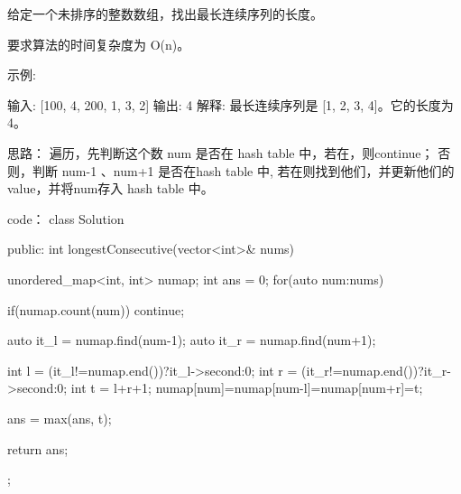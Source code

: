 给定一个未排序的整数数组，找出最长连续序列的长度。

要求算法的时间复杂度为 O(n)。

示例:

输入: [100, 4, 200, 1, 3, 2]
输出: 4
解释: 最长连续序列是 [1, 2, 3, 4]。它的长度为 4。
































思路：
遍历，先判断这个数 num 是否在 hash table 中，若在，则continue；
否则，判断 num-1 、num+1 是否在hash table 中, 若在则找到他们，并更新他们的 value，并将num存入 hash table 中。


































code：
class Solution {
public:
    int longestConsecutive(vector<int>& nums) {
        unordered_map<int, int> numap;
        int ans = 0;
        for(auto num:nums)
        {
            if(numap.count(num)) continue;
            
            auto it_l = numap.find(num-1);
            auto it_r = numap.find(num+1);
            
            int l = (it_l!=numap.end())?it_l->second:0;
            int r = (it_r!=numap.end())?it_r->second:0;
            int t = l+r+1;        
            numap[num]=numap[num-l]=numap[num+r]=t;
            
            ans = max(ans, t);
        }
        return ans;
    }
};